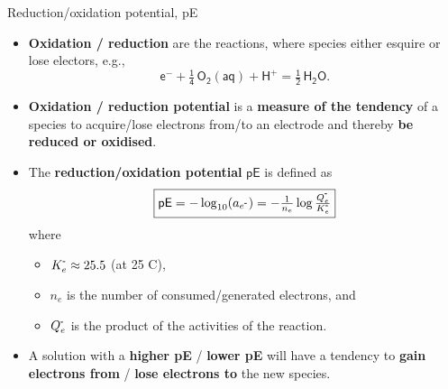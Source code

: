 \begin{frame}{Reduction/oxidation potential, pE}
\begin{itemize}
	\item  \alert{\textbf{Oxidation / reduction}} are the reactions, where species either esquire or lose electors, e.g., 
	\[
	\mathsf{e^- + \tfrac{1}{4} \, O_2(aq) + H^+ = \tfrac{1}{2} \, H_2O.}
	\]
	\vskip -10pt
	\pause
\item \alert{\textbf{Oxidation / reduction potential}} is a {\bf measure of the tendency} of a species to acquire/lose electrons from/to an electrode and thereby {\bf be reduced or oxidised}. 
%
	\pause
\item The \alert{\textbf{reduction/oxidation potential}} $\mathsf{pE}$ is defined as
%
\[
\boxed{ \mathsf{pE} = - \log_{10} (a_{e^{\scalebox{0.75}[1.0]{-}}}) = -\tfrac{1}{n_e} \log \tfrac{Q^{\scalebox{0.75}[1.0]{-}}_e}{K^{\scalebox{0.75}[1.0]{-}}_e} }
\]
\vskip -5pt
%
where 
\begin{itemize}
	\item $K^{\scalebox{0.75}[1.0]{-}}_e \approx 25.5$ (at 25 \textdegree C), 
	\item $n_e$ is the number of consumed/generated electrons, and 
	\item $Q^{\scalebox{0.75}[1.0]{-}}_e$ is the product of the activities of the reaction. 
\end{itemize}
%
	\pause
\item A solution with a {\bf higher pE} /  {\bf lower pE} will have a tendency to {\bf gain electrons from} / {\bf lose electrons to} the new species.
%
\end{itemize}

\end{frame}
%
%
